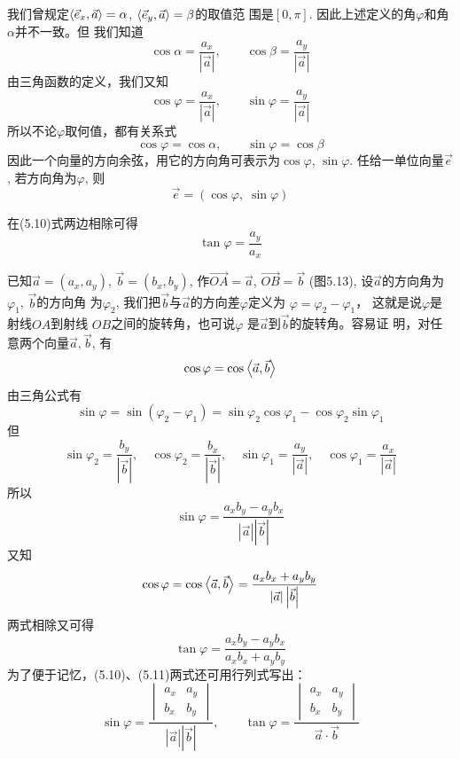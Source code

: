 我们曾规定$\left\langle \vec{e}_x,\vec{a} \right\rangle=\alpha$, $\left\langle \vec{e}_y,\vec{a} \right\rangle=\beta$的取值范
围是$[0,\pi]$. 因此上述定义的角$\varphi$和角$\alpha$并不一致。但
我们知道
\[\cos\alpha=\frac{a_x}{|\vec{a}|},\qquad \cos\beta=\frac{a_y}{|\vec{a}|}\]
由三角函数的定义，我们又知
\[\cos\varphi=\frac{a_x}{|\vec{a}|},\qquad \sin\varphi=\frac{a_y}{|\vec{a}|}\]
所以不论$\varphi$取何值，都有关系式
\[\cos\varphi=\cos\alpha,\qquad \sin\varphi=\cos\beta\]
因此一个向量的方向余弦，用它的方向角可表示为$\cos\varphi$, $
\sin\varphi$. 任给一单位向量$\vec{e}$, 若方向角为$\varphi$, 则
\[\vec{e}=(\cos\varphi,\; \sin\varphi)\]

在(5.10)式两边相除可得
\[\tan \varphi =\frac{a_y}{a_x}\]

\begin{figure}[htp]
    \centering
{}
    \caption{}
\end{figure}


已知$\vec{a}=(a_x,a_y)$, $\vec{b}=(b_x,b_y)$, 作$\Vec{OA}=\vec{a}$, $\Vec{OB}=\vec{b}$ (图5.13), 设$\vec{a}$的方向角为$\varphi_1$, $\vec{b}$的方向角
为$\varphi_2$, 我们把$\vec{b}$与$\vec{a}$的方向差$\varphi$定义为
$\varphi=\varphi_2-\varphi_1$，
这就是说$\varphi$是射线$OA$到射线
$OB$之间的旋转角，也可说$\varphi$ 
是$\vec{a}$到$\vec{b}$的旋转角。容易证
明，对任意两个向量$\vec{a},\vec{b}$, 
有
\[\cos\varphi =\cos\left\langle \vec{a},\vec{b} \right\rangle\]
由三角公式有
\[\sin\varphi  =\sin(\varphi_2-\varphi_1 ) = \sin\varphi_2\cos\varphi_1 -\cos\varphi_2\sin\varphi_1\]
但
\[\sin\varphi_2=\frac{b_y}{|\vec{b}|},\quad \cos\varphi_2=\frac{b_x}{|\vec{b}|},\quad \sin\varphi_1=\frac{a_y}{|\vec{a}|},\quad \cos\varphi_1=\frac{a_x}{|\vec{a}|}\]
所以
\begin{equation}
    \sin\varphi=\frac{a_xb_y-a_yb_x}{|\vec{a}|\left|\vec{b}\right|}
\end{equation}
又知
\[\cos\varphi =\cos\left\langle \vec{a},\vec{b} \right\rangle=\dfrac{a_xb_x+a_yb_y}{|\vec{a}|\left|\vec{b}\right|}\]
两式相除又可得
\[\tan\varphi =\frac{a_xb_y-a_yb_x}{a_xb_x+a_yb_y}\]
为了便于记忆，(5.10)、(5.11)两式还可用行列式写出：
\[\sin\varphi=\frac{\begin{vmatrix}
    a_x& a_y\\b_x&b_y
\end{vmatrix}}{|\vec{a}|\left|\vec{b}\right|},\qquad \tan\varphi=\frac{\begin{vmatrix}
    a_x& a_y\\b_x&b_y
\end{vmatrix}}{\vec{a}\cdot \vec{b}}\]



